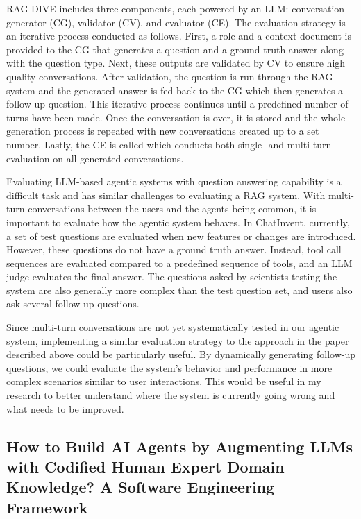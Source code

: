 \documentclass[11pt]{article}
\begin{document}
RAG-DIVE includes three components, each powered by an LLM: conversation generator (CG), validator (CV), and evaluator (CE). The evaluation strategy is an iterative process conducted as follows. First, a role and a context document is provided to the CG that generates a question and a ground truth answer along with the question type. Next, these outputs are validated by CV to ensure high quality conversations. After validation, the question is run through the RAG system and the generated answer is fed back to the CG which then generates a follow-up question. This iterative process continues until a predefined number of turns have been made. Once the conversation is over, it is stored and the whole generation process is repeated with new conversations created up to a set number. Lastly, the CE is called which conducts both single- and multi-turn evaluation on all generated conversations.

Evaluating LLM-based agentic systems with question answering capability is a difficult task and has similar challenges to evaluating a RAG system. With multi-turn conversations between the users and the agents being common, it is important to evaluate how the agentic system behaves.
In ChatInvent, currently, a set of test questions are evaluated when new features or changes are introduced. However, these questions do not have a ground truth answer. Instead, tool call sequences are evaluated compared to a predefined sequence of tools, and an LLM judge evaluates the final answer. The questions asked by scientists testing the system are also generally more complex than the test question set, and users also ask several follow up questions. 

Since multi-turn conversations are not yet systematically tested in our agentic system, implementing a similar evaluation strategy to the approach in the paper described above could be particularly useful. By dynamically generating follow-up questions, we could evaluate the system's behavior and performance in more complex scenarios similar to user interactions. This would be useful in my research to better understand where the system is currently going wrong and what needs to be improved.



\subsection{How to Build AI Agents by Augmenting LLMs with Codified Human Expert Domain Knowledge? A Software Engineering Framework}
\end{document}
